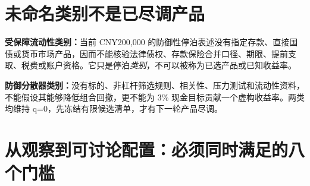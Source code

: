 \section{未命名类别不是已尽调产品}

\begin{riskbox}[两个不可跳过的范围缺口]
\textbf{受保障流动性类别：}当前 CNY200,000 的防御性停泊表述没有指定存款、直接国债或货币市场产品，因而不能核验法律债权、存款保险合并口径、期限、提前支取、税费或账户资格。它只是停泊\emph{类别}，不可以被称为已选产品或已知收益率。\par
\textbf{防御分散器类别：}没有标的、非杠杆筛选规则、相关性、压力测试和流动性资料，不能假设其能够降低组合回撤，更不能为 3\% 现金目标贡献一个虚构收益率。两类均维持 q=0，先冻结有限候选清单，才有下一轮产品尽调。
\end{riskbox}

\section{从观察到可讨论配置：必须同时满足的八个门槛}


